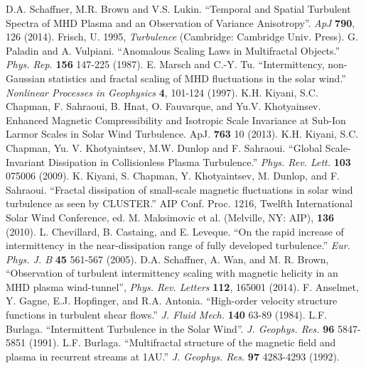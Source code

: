 \documentclass[preprint2]{aastex}
\begin{document}
\begin{thebibliography}{}

 D.A. Schaffner, M.R. Brown and V.S. Lukin. ``Temporal and Spatial Turbulent Spectra of MHD Plasma and an Observation of Variance Anisotropy''. {\it ApJ} {\bf 790}, 126 (2014).
 Frisch, U. 1995, {\it Turbulence} (Cambridge: Cambridge Univ. Press).
 G. Paladin and A. Vulpiani. ``Anomalous Scaling Laws in Multifractal Objects.'' {\it Phys. Rep.} {\bf 156} 147-225 (1987).
 E. Marsch and C.-Y. Tu. ``Intermittency, non-Gaussian statistics and fractal scaling of MHD fluctuations in the solar wind.'' {\it Nonlinear Processes in Geophysics} {\bf 4}, 101-124 (1997).
 K.H. Kiyani, S.C. Chapman, F. Sahraoui, B. Hnat, O. Fauvarque, and Yu.V. Khotyainsev. Enhanced Magnetic Compressibility and Isotropic Scale Invariance at Sub-Ion Larmor Scales in Solar Wind Turbulence. ApJ. {\bf 763} 10 (2013).
 K.H. Kiyani, S.C. Chapman, Yu. V. Khotyaintsev, M.W. Dunlop and F. Sahraoui. ``Global Scale-Invariant Dissipation in Collisionless Plasma Turbulence.'' {\it Phys. Rev. Lett.} {\bf 103} 075006 (2009). 
 K. Kiyani, S. Chapman, Y. Khotyaintsev, M. Dunlop, and F. Sahraoui. ``Fractal dissipation of small-scale magnetic fluctuations in solar wind turbulence as seen by CLUSTER.'' AIP Conf. Proc. 1216, Twelfth International Solar Wind Conference, ed. M. Maksimovic et al. (Melville, NY: AIP), {\bf 136} (2010).
 L. Chevillard, B. Castaing, and E. Leveque. ``On the rapid increase of intermittency in the near-dissipation range of fully developed turbulence.'' {\it Eur. Phys. J. B} {\bf 45} 561-567 (2005).
 D.A. Schaffner, A. Wan, and M. R. Brown, ``Observation of turbulent intermittency scaling with magnetic helicity in an MHD plasma wind-tunnel'', {\it Phys. Rev. Letters} {\bf 112}, 165001 (2014).
 F. Anselmet, Y. Gagne, E.J. Hopfinger, and R.A. Antonia. ``High-order velocity structure functions in turbulent shear flows.'' {\it J. Fluid Mech.} {\bf 140} 63-89 (1984).
 L.F. Burlaga. ``Intermittent Turbulence in the Solar Wind''. {\it J. Geophys. Res.} {\bf 96} 5847-5851 (1991).
 L.F. Burlaga. ``Multifractal structure of the magnetic field and plasma in recurrent streams at 1AU.'' {\it J. Geophys. Res.} {\bf 97} 4283-4293 (1992).

\end{thebibliography}
\end{document}
